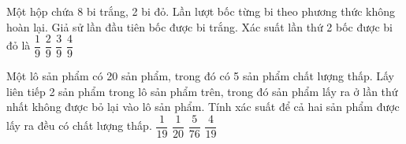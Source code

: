 \begin{ex}%
    Một hộp chứa 8 bi trắng, 2 bi đỏ. Lần lượt bốc từng bi theo phương thức không hoàn lại. Giả sử lần đầu tiên bốc được bi trắng. Xác suất lần thứ 2 bốc được bi đỏ là
    \choice
    {$\dfrac{1}{9}$}
    {\True $\dfrac{2}{9}$}
    {$\dfrac{3}{9}$}
    {$\dfrac{4}{9}$}
\end{ex}
\begin{ex}%
    Một lô sản phẩm có 20 sản phẩm, trong đó có 5 sản phẩm chất lượng thấp. Lấy liên tiếp 2 sản phẩm trong lô sản phẩm trên, trong đó sản phẩm lấy ra ở lần thứ nhất không được bỏ lại vào lô sản phẩm. Tính xác suất để cả hai sản phẩm được lấy ra đều có chất lượng thấp.
    \choice
    {\True $\dfrac{1}{19}$}
    {$\dfrac{1}{20}$}
    {$\dfrac{5}{76}$}
    {$\dfrac{4}{19}$}
\end{ex}
